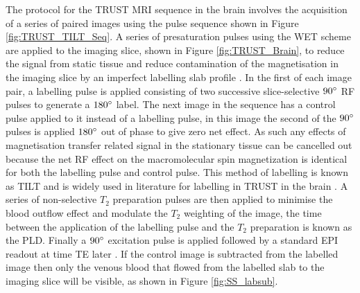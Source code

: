 The protocol for the \ac{TRUST} \ac{MRI} sequence in the brain involves the acquisition of a series of paired images using the pulse sequence shown in Figure \ref{fig:TRUST_TILT_Seq}. A series of presaturation pulses using the \ac{WET} scheme are applied to the imaging slice, shown in Figure \ref{fig:TRUST_Brain}, to reduce the signal from static tissue and reduce contamination of the magnetisation in the imaging slice by an imperfect labelling slab profile \cite{hendrikse_measurements_2003, golay_pulsed_2005}. In the first of each image pair, a labelling pulse is applied consisting of two successive slice-selective $90\degree$ \ac{RF} pulses to generate a $180\degree$ label. The next image in the sequence has a control pulse applied to it instead of a labelling pulse, in this image the second of the $90\degree$ pulses is applied $180\degree$ out of phase to give zero net effect. As such any effects of magnetisation transfer related signal in the stationary tissue can be cancelled out because the net \ac{RF} effect on the macromolecular spin magnetization is identical for both the labelling pulse and control pulse. This method of labelling is known as \ac{TILT} and is widely used in literature for labelling in \ac{TRUST} in the brain \cite{golay_transfer_1999}. A series of non-selective $T_2$ preparation pulses are then applied to minimise the blood outflow effect and modulate the $T_2$ weighting of the image, the time between the application of the labelling pulse and the $T_2$ preparation is known as the \ac{PLD}. Finally a $90\degree$ excitation pulse is applied followed by a standard \ac{EPI} readout at time \ac{TE} later \cite{xu_improving_2012}. If the control image is subtracted from the labelled image then only the venous blood that flowed from the labelled slab to the imaging slice will be visible, as shown in Figure \ref{fig:SS_labsub}.\\

